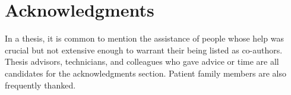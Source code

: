 
\chapter*{Acknowledgments}
In a thesis, it is common to mention the assistance of
people whose help was crucial but not extensive enough to warrant
their being listed as co-authors. Thesis advisors, technicians, and
colleagues  who gave advice or time are all candidates for the
acknowledgments section. Patient family members are also frequently thanked.

